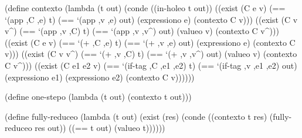 \schemedisplayspace
\begin{schemedisplay}
(define contexto
  (lambda (t out)
    (conde
      ((in-holeo t out))
      ((exist (C e v)
         (== `(app ,C ,e) t)
         (== `(app ,v ,e) out)
         (expressiono e)
         (contexto C v)))
      ((exist (C v v^)
         (== `(app ,v ,C) t)
         (== `(app ,v ,v^) out)
         (valueo v)
         (contexto C v^)))
      ((exist (C e v)
         (== `(+ ,C ,e) t)
         (== `(+ ,v ,e) out)
         (expressiono e)
         (contexto C v)))
      ((exist (C v v^)
         (== `(+ ,v ,C) t)
         (== `(+ ,v ,v^) out)
         (valueo v)
         (contexto C v^)))
      ((exist (C e1 e2 v)
         (== `(if-tag ,C ,e1 ,e2) t)
         (== `(if-tag ,v ,e1 ,e2) out)
         (expressiono e1)
         (expressiono e2)
         (contexto C v))))))
\end{schemedisplay}

\schemedisplayspace
\begin{schemedisplay}
(define one-stepo
  (lambda (t out)
    (contexto t out)))
\end{schemedisplay}

\schemedisplayspace
\begin{schemedisplay}
(define fully-reduceo
  (lambda (t out)
    (exist (res)
      (conde
        ((contexto t res)
         (fully-reduceo res out))
        ((== t out) (valueo t))))))
\end{schemedisplay}



